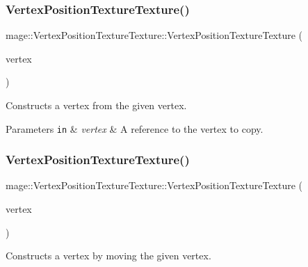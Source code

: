 \subsubsection{\texorpdfstring{Vertex\+Position\+Texture\+Texture()}{VertexPositionTextureTexture()}\hspace{0.1cm}{\footnotesize\ttfamily [3/4]}}
{\footnotesize\ttfamily mage\+::\+Vertex\+Position\+Texture\+Texture\+::\+Vertex\+Position\+Texture\+Texture (\begin{DoxyParamCaption}\item[{const \hyperlink{structmage_1_1_vertex_position_texture_texture}{Vertex\+Position\+Texture\+Texture} \&}]{vertex }\end{DoxyParamCaption})\hspace{0.3cm}{\ttfamily [default]}}

Constructs a vertex from the given vertex.


\begin{DoxyParams}[1]{Parameters}
\mbox{\tt in}  & {\em vertex} & A reference to the vertex to copy. \\
\hline
\end{DoxyParams}
\hypertarget{structmage_1_1_vertex_position_texture_texture_abd23d266932ec6f8c830b804a25a1fe5}{}\label{structmage_1_1_vertex_position_texture_texture_abd23d266932ec6f8c830b804a25a1fe5} 
\subsubsection{\texorpdfstring{Vertex\+Position\+Texture\+Texture()}{VertexPositionTextureTexture()}\hspace{0.1cm}{\footnotesize\ttfamily [4/4]}}
{\footnotesize\ttfamily mage\+::\+Vertex\+Position\+Texture\+Texture\+::\+Vertex\+Position\+Texture\+Texture (\begin{DoxyParamCaption}\item[{\hyperlink{structmage_1_1_vertex_position_texture_texture}{Vertex\+Position\+Texture\+Texture} \&\&}]{vertex }\end{DoxyParamCaption})\hspace{0.3cm}{\ttfamily [default]}}

Constructs a vertex by moving the given vertex.


